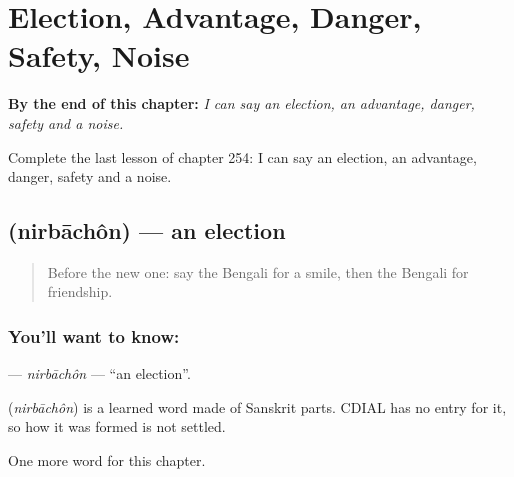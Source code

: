 
\chapter{Election, Advantage, Danger, Safety, Noise}
\label{ch:bn-election-advantage-danger-safety-noise}

\begin{chapteropening}
\textbf{By the end of this chapter:} \emph{I can say an election, an advantage, danger, safety and a noise.}

Complete the last lesson of chapter 254: I can say an election, an advantage, danger, safety and a noise.
\end{chapteropening}

\section[\texorpdfstring{\bn{নির্বাচন} (nirbāchôn)}{নির্বাচন (nirbāchôn)}]{ (nirbāchôn) — an election}

\label{lesson:BN-C254-nirbachon}



\begin{quote}
Before the new one: say the Bengali for a smile, then the Bengali for friendship.
\end{quote}

\subsection*{You'll want to know: }
\textbf{} — \emph{nirbāchôn} — \textquotedblleft{}an election\textquotedblright{}.

\begin{cousinweb}
\textbf{} (\emph{nirbāchôn}) is a learned word made of Sanskrit parts. CDIAL has no entry for it, so how it was formed is not settled.
\end{cousinweb}

\begin{grammarlens}[title={What you've built}]
One more word for this chapter.
\end{grammarlens}

